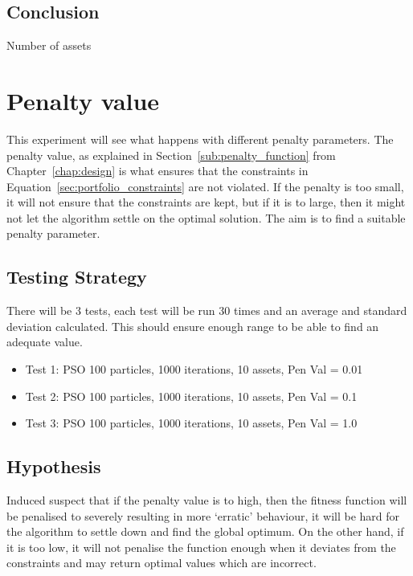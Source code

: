 \documentclass{pdfmx4020}
\begin{document}

    \subsection{Conclusion} %
    \label{sub:conclusion}
      

    Number of assets

  \section{Penalty value} %
  \label{sec:penalty_value}
  This experiment will see what happens with different penalty parameters. The penalty value, as explained in Section~\ref{sub:penalty_function} from Chapter~\ref{chap:design} is what ensures that the constraints in Equation~\ref{sec:portfolio_constraints} are not violated. If the penalty is too small, it will not ensure that the constraints are kept, but if it is to large, then it might not let the algorithm settle on the optimal solution. The aim is to find a suitable penalty parameter. 

    \subsection{Testing Strategy}
      There will be 3 tests, each test will be run 30 times and an average and standard deviation calculated. This should ensure enough range to be able to find an adequate value.
      \begin{itemize}
        \item Test 1: PSO 100 particles, 1000 iterations, 10 assets, Pen Val = 0.01
        \item Test 2: PSO 100 particles, 1000 iterations, 10 assets, Pen Val = 0.1
        \item Test 3: PSO 100 particles, 1000 iterations, 10 assets, Pen Val = 1.0
      \end{itemize}

    \subsection{Hypothesis}
    Induced suspect that if the penalty value is to high, then the fitness function will be penalised to severely resulting in more `erratic' behaviour, it will be hard for the algorithm to settle down and find the global optimum. On the other hand, if it is too low, it will not penalise the function enough when it deviates from the constraints and may return optimal values which are incorrect. 
\end{document}
